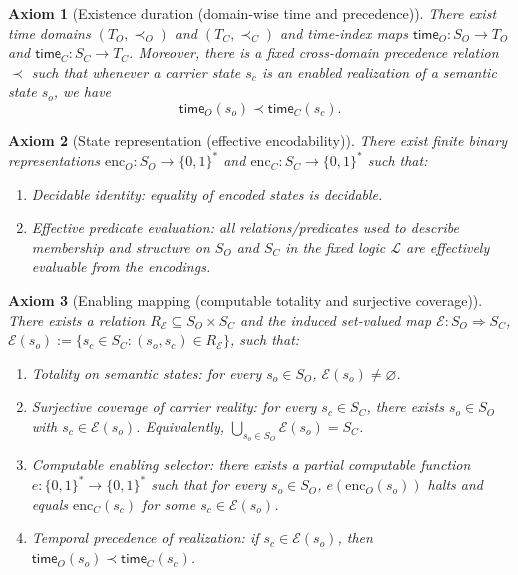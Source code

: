 \documentclass[journal]{IEEEtran}
\newcommand{\enc}{\text{enc}}
\newcommand{\timeindex}{\mathsf{time}}
\newtheorem{axiom}{Axiom}[section]
\numberwithin{equation}{section}
\begin{document}
\begin{axiom}[Existence duration (domain-wise time and precedence)]
\label{ax:existence-duration}
There exist time domains \((T_O,\prec_O)\) and \((T_C,\prec_C)\) and time-index maps
\(\timeindex_O:S_O\to T_O\) and \(\timeindex_C:S_C\to T_C\).
Moreover, there is a fixed cross-domain precedence relation \(\prec\) such that whenever a carrier
state \(s_c\) is an enabled realization of a semantic state \(s_o\), we have
\[
  \timeindex_O(s_o) \prec \timeindex_C(s_c).
\]
\end{axiom}

\begin{axiom}[State representation (effective encodability)]
\label{ax:state-representation}
There exist finite binary representations \(\enc_O:S_O\to\{0,1\}^*\) and \(\enc_C:S_C\to\{0,1\}^*\) such that:
\begin{enumerate}[label=\textup{(R\arabic*)}]
  \item \emph{Decidable identity:} equality of encoded states is decidable.
  \item \emph{Effective predicate evaluation:} all relations/predicates used to describe membership and
  structure on \(S_O\) and \(S_C\) in the fixed logic \(\mathcal L\) are effectively evaluable from the encodings.
\end{enumerate}
\end{axiom}

\begin{axiom}[Enabling mapping (computable totality and surjective coverage)]
\label{ax:enabling-mapping}
There exists a relation \(R_{\mathcal E}\subseteq S_O\times S_C\) and the induced set-valued map
\(\mathcal E:S_O\Rightarrow S_C\), \(\mathcal E(s_o):=\{s_c\in S_C:(s_o,s_c)\in R_{\mathcal E}\}\), such that:
\begin{enumerate}[label=\textup{(E\arabic*)}]
  \item \emph{Totality on semantic states:} for every \(s_o\in S_O\), \(\mathcal E(s_o)\neq\varnothing\).
  \item \emph{Surjective coverage of carrier reality:} for every \(s_c\in S_C\), there exists \(s_o\in S_O\)
  with \(s_c\in \mathcal E(s_o)\). Equivalently, \(\bigcup_{s_o\in S_O}\mathcal E(s_o)=S_C\).
  \item \emph{Computable enabling selector:} there exists a partial computable function
  \(e:\{0,1\}^*\to\{0,1\}^*\) such that for every \(s_o\in S_O\), \(e(\enc_O(s_o))\) halts and equals
  \(\enc_C(s_c)\) for some \(s_c\in\mathcal E(s_o)\).
  \item \emph{Temporal precedence of realization:} if \(s_c\in \mathcal E(s_o)\), then
  \(\timeindex_O(s_o) \prec \timeindex_C(s_c)\).
\end{enumerate}
\end{axiom}
\end{document}
